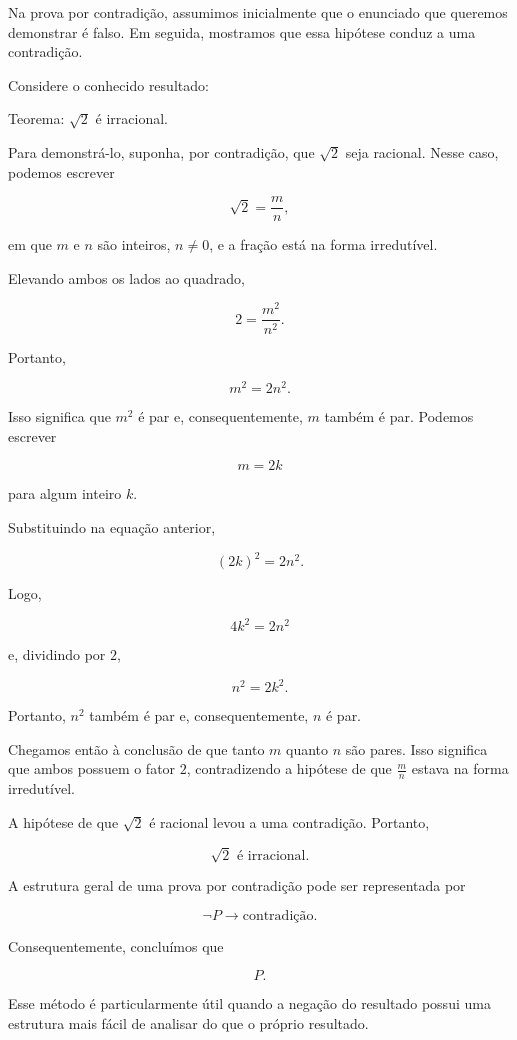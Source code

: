 \documentclass[
  brazilian,
  letterpaper,
]{book}
\theoremstyle{plain}
\theoremstyle{definition}
\theoremstyle{remark}
\begin{document}
Na prova por contradição, assumimos inicialmente que o enunciado que
queremos demonstrar é falso. Em seguida, mostramos que essa hipótese
conduz a uma contradição.

Considere o conhecido resultado:

Teorema: \(\sqrt{2}\) é irracional.

Para demonstrá-lo, suponha, por contradição, que \(\sqrt{2}\) seja
racional. Nesse caso, podemos escrever

\[
\sqrt{2}=\frac{m}{n},
\]

em que \(m\) e \(n\) são inteiros, \(n\neq0\), e a fração está na forma
irredutível.

Elevando ambos os lados ao quadrado,

\[
2=\frac{m^2}{n^2}.
\]

Portanto,

\[
m^2=2n^2.
\]

Isso significa que \(m^2\) é par e, consequentemente, \(m\) também é
par. Podemos escrever

\[
m=2k
\]

para algum inteiro \(k\).

Substituindo na equação anterior,

\[
(2k)^2=2n^2.
\]

Logo,

\[
4k^2=2n^2
\]

e, dividindo por \(2\),

\[
n^2=2k^2.
\]

Portanto, \(n^2\) também é par e, consequentemente, \(n\) é par.

Chegamos então à conclusão de que tanto \(m\) quanto \(n\) são pares.
Isso significa que ambos possuem o fator \(2\), contradizendo a hipótese
de que \(\frac{m}{n}\) estava na forma irredutível.

A hipótese de que \(\sqrt{2}\) é racional levou a uma contradição.
Portanto,

\[
\boxed{\sqrt{2}\text{ é irracional}.}
\]

A estrutura geral de uma prova por contradição pode ser representada por

\[
\neg P
\rightarrow
\text{contradição}.
\]

Consequentemente, concluímos que

\[
P.
\]

Esse método é particularmente útil quando a negação do resultado possui
uma estrutura mais fácil de analisar do que o próprio resultado.
\end{document}
